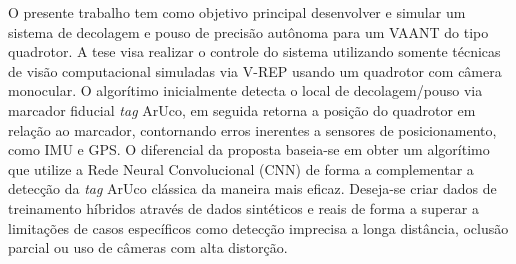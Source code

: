 O presente trabalho tem como objetivo principal desenvolver e simular um sistema de decolagem e pouso de precisão autônoma para um VAANT do tipo quadrotor. A tese visa realizar o controle do sistema utilizando somente técnicas de visão computacional simuladas via V-REP usando um quadrotor com câmera monocular. O algorítimo inicialmente detecta o local de decolagem/pouso via marcador fiducial \textit{tag} ArUco, em seguida retorna a posição do quadrotor em relação ao marcador, contornando erros inerentes a sensores de posicionamento, como IMU e GPS. O diferencial da proposta baseia-se em obter um algorítimo que utilize a Rede Neural Convolucional (CNN) de forma a complementar a detecção da \textit{tag} ArUco clássica da maneira mais eficaz. Deseja-se criar dados de treinamento híbridos através de dados sintéticos e reais de forma a superar a limitações de casos específicos como detecção imprecisa a longa distância, oclusão parcial ou uso de câmeras com alta distorção.

\vspace{\fill}

    
    
  
  
  
  
  
  
